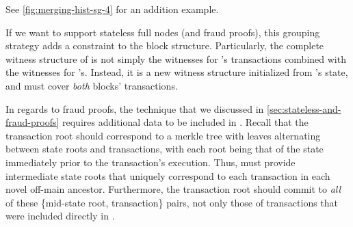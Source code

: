 See \autoref{fig:merging-hist-sg-4} for an addition example.

If we want to support stateless full nodes (and fraud proofs), this grouping strategy adds a constraint to the block structure.
Particularly, the complete witness structure of  is not simply the witnesses for 's transactions combined with the witnesses for 's.
Instead, it is a new witness structure initialized from 's state, and must cover \emph{both} blocks' transactions.

In regards to fraud proofs, the technique that we discussed in \autoref{sec:stateless-and-fraud-proofs} requires additional data to be included in .
Recall that the transaction root should correspond to a merkle tree with leaves alternating between state roots and transactions, with each root being that of the state immediately prior to the transaction's execution.
Thus,  must provide intermediate state roots that uniquely correspond to each transaction in each novel off-main ancestor.
Furthermore, the transaction root should commit to \emph{all} of these \{mid-state root, transaction\} pairs, not only those of transactions that were included directly in .



